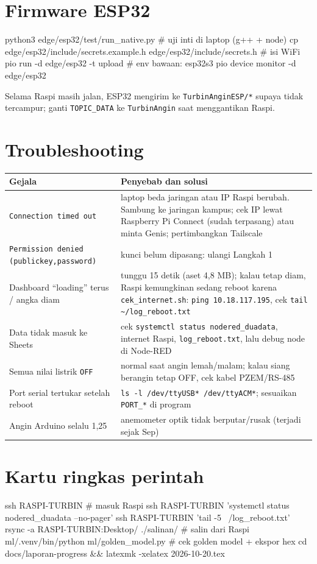 \documentclass[10.5pt,a4paper]{article}
\newcommand{\cmd}[1]{\texttt{#1}}
\begin{document}
\section{Firmware ESP32}
\begin{terminal}
python3 edge/esp32/test/run_native.py                 # uji inti di laptop (g++ + node)
cp edge/esp32/include/secrets.example.h edge/esp32/include/secrets.h   # isi WiFi
pio run -d edge/esp32 -t upload                       # env bawaan: esp32s3
pio device monitor -d edge/esp32
\end{terminal}
Selama Raspi masih jalan, ESP32 mengirim ke \cmd{TurbinAnginESP/*} supaya tidak tercampur; ganti \cmd{TOPIC\_DATA} ke \cmd{TurbinAngin} saat menggantikan Raspi.

\section{Troubleshooting}
\begin{center}
\small
\begin{tabularx}{\linewidth}{@{}l X@{}}
\toprule
Gejala & Penyebab dan solusi \\
\midrule
\cmd{Connection timed out} & laptop beda jaringan atau IP Raspi berubah. Sambung ke jaringan kampus; cek IP lewat Raspberry Pi Connect (sudah terpasang) atau minta Genis; pertimbangkan Tailscale \\
\cmd{Permission denied (publickey,password)} & kunci belum dipasang: ulangi Langkah 1 \\
Dashboard ``loading'' terus / angka diam & tunggu 15 detik (aset 4,8 MB); kalau tetap diam, Raspi kemungkinan sedang reboot karena \cmd{cek\_internet.sh}: \cmd{ping 10.18.117.195}, cek \cmd{tail \textasciitilde/log\_reboot.txt} \\
Data tidak masuk ke Sheets & cek \cmd{systemctl status nodered\_duadata}, internet Raspi, \cmd{log\_reboot.txt}, lalu debug node di Node-RED \\
Semua nilai listrik \cmd{OFF} & normal saat angin lemah/malam; kalau siang berangin tetap OFF, cek kabel PZEM/RS-485 \\
Port serial tertukar setelah reboot & \cmd{ls -l /dev/ttyUSB* /dev/ttyACM*}; sesuaikan \cmd{PORT\_*} di program \\
Angin Arduino selalu 1,25 & anemometer optik tidak berputar/rusak (terjadi sejak Sep) \\
\bottomrule
\end{tabularx}
\end{center}

\section{Kartu ringkas perintah}
\begin{terminal}
ssh RASPI-TURBIN                                   # masuk Raspi
ssh RASPI-TURBIN 'systemctl status nodered_duadata --no-pager'
ssh RASPI-TURBIN 'tail -5 ~/log_reboot.txt'
rsync -a RASPI-TURBIN:Desktop/ ./salinan/          # salin dari Raspi
ml/.venv/bin/python ml/golden_model.py             # cek golden model + ekspor hex
cd docs/laporan-progress && latexmk -xelatex 2026-10-20.tex
\end{terminal}
\end{document}
